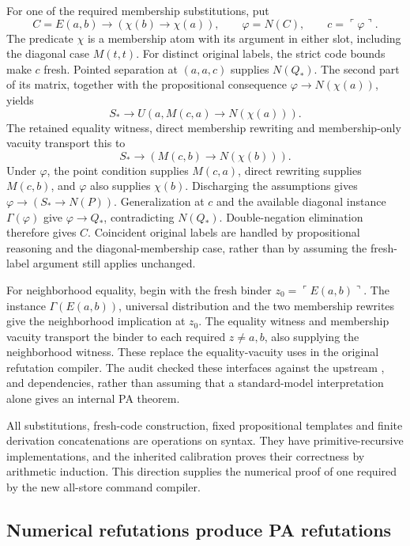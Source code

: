 For one of the required membership substitutions, put
\[
 C=E(a,b)\to(\chi(b)\to\chi(a)),\qquad
 \varphi=N(C),\qquad c=\ulcorner\varphi\urcorner.
\]
The predicate $\chi$ is a membership atom with its argument in either
slot, including the diagonal case $M(t,t)$. For distinct original labels,
the strict code bounds make $c$ fresh. Pointed separation at $(a,a,c)$
supplies $N(Q_*)$. The second part of its matrix, together with the
propositional consequence $\varphi\to N(\chi(a))$, yields
\[
 S_*\to U(a,M(c,a)\to N(\chi(a))).
\]
The retained equality witness, direct membership rewriting and
membership-only vacuity transport this to
\[
 S_*\to(M(c,b)\to N(\chi(b))).
\]
Under $\varphi$, the point condition supplies $M(c,a)$, direct rewriting
supplies $M(c,b)$, and $\varphi$ also supplies $\chi(b)$. Discharging the
assumptions gives $\varphi\to(S_*\to N(P))$. Generalization at $c$ and
the available diagonal instance $\Gamma(\varphi)$ give
$\varphi\to Q_*$, contradicting $N(Q_*)$. Double-negation elimination
therefore gives $C$. Coincident original labels are handled by
propositional reasoning and the diagonal-membership case, rather than by
assuming the fresh-label argument still applies unchanged.

For neighborhood equality, begin with the fresh binder
$z_0=\ulcorner E(a,b)\urcorner$. The instance $\Gamma(E(a,b))$,
universal distribution and the two membership rewrites give the
neighborhood implication at $z_0$. The equality witness and membership
vacuity transport the binder to each required $z\ne a,b$, also supplying
the neighborhood witness. These replace the equality-vacuity uses in the
original refutation compiler. The audit checked these interfaces against
the upstream ,  and
 dependencies, rather than assuming that a standard-model
interpretation alone gives an internal PA theorem.

All substitutions, fresh-code construction, fixed propositional
templates and finite derivation concatenations are operations on syntax.
They have primitive-recursive implementations, and the inherited
calibration proves their correctness by arithmetic induction. This
direction supplies the numerical proof of one required by the new
all-store command compiler.

\subsection{Numerical refutations produce PA refutations}

